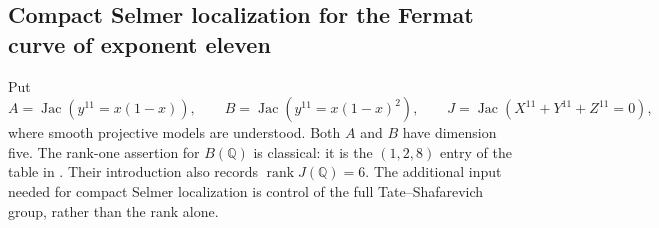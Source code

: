 \subsection{Compact Selmer localization for the Fermat curve of exponent eleven}
\label{subsec:eleven-compact-localization}

Put
\[
 A=\operatorname{Jac}(y^{11}=x(1-x)),\qquad
 B=\operatorname{Jac}(y^{11}=x(1-x)^2),\qquad
 J=\operatorname{Jac}(X^{11}+Y^{11}+Z^{11}=0),
\]
where smooth projective models are understood.  Both $A$ and $B$
have dimension five.  The rank-one assertion for $B(\mathbb Q)$ is
classical: it is the $(1,2,8)$ entry of the table in
\citet[\S4, p.~219]{GrossRohrlich1978}.  Their introduction also
records $\operatorname{rank}J(\mathbb Q)=6$.  The additional input
needed for compact Selmer localization is control of the full
Tate--Shafarevich group, rather than the rank alone.

